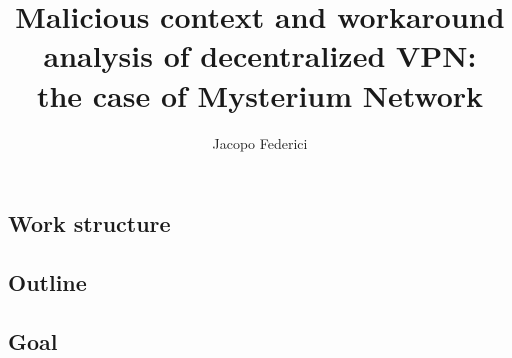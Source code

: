 \documentclass[12pt]{article}
\title{Malicious context and workaround analysis of decentralized VPN:\\the case of Mysterium Network}
\author{Jacopo Federici}
\begin{document}
	\raggedright
	\maketitle	
	\clearpage
	
	\tableofcontents{}
	\pagebreak

	\begin{abstract}
		
	\end{abstract}
	\pagebreak

	\subsection{Work structure}
	\subsection{Outline}
	\subsection{Goal}
\end{document}
